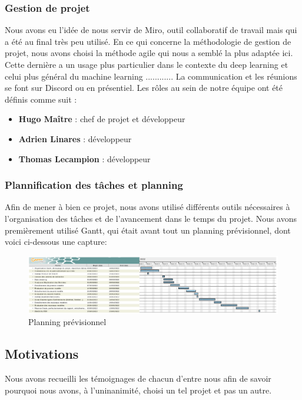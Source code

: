 \documentclass[12pt,a4paper]{report}
\begin{document}
\begin{spacing}{1.5}
\subsubsection{Gestion de projet}

Nous avons eu l’idée de nous servir de Miro, outil collaboratif de travail mais qui a été au final très peu utilisé. En ce qui concerne la méthodologie de gestion de projet, nous avons choisi la méthode agile qui nous a semblé la plus adaptée ici.
Cette dernière a un usage plus particulier dans le contexte du deep learning et celui plus général du machine learning ............
La communication et les réunions se font sur Discord ou en présentiel.
Les rôles au sein de notre équipe ont été définis comme suit : \\
\begin{itemize}
    \item \textbf{Hugo Maître} : chef de projet et développeur 
    \item \textbf{Adrien Linares} : développeur
    \item \textbf{Thomas Lecampion} : développeur
\end{itemize} 

\subsubsection{Plannification des tâches et planning}

Afin de mener à bien ce projet, nous avons utilisé différents outils nécessaires à l’organisation des tâches et de l’avancement dans le temps du projet. Nous avons premièrement utilisé Gantt, qui était avant tout un planning prévisionnel, dont voici ci-dessous une capture:

\begin{figure}[H]
\begin{center}
\includegraphics[scale=0.44]{figures/ganttTER.png}
\caption{Planning prévisionnel}
\end{center}
\end{figure}

\subsection{Motivations}
Nous avons recueilli les témoignages de chacun d'entre nous afin de savoir pourquoi nous avons, à l'uninanimité, choisi un tel projet et pas un autre.


\end{spacing}
\end{document}
